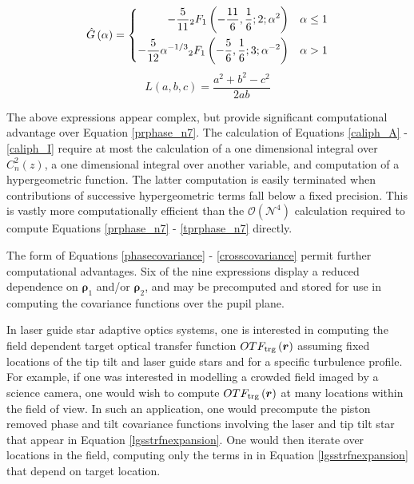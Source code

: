 \begin{equation}\label{G_hat_eqn}
\hat{G}\left(\alpha\right) = 
\left\{
\begin{aligned}
-\frac{5}{11} \vphantom{F}_{2}F_{1}\left(-\frac{11}{6}, \frac{1}{6};2; \alpha^{2}\right)              & \quad \alpha\le 1 \\
-\frac{5}{12} \alpha^{-1/3} \vphantom{F}_{2}F_{1}\left(-\frac{5}{6}, \frac{1}{6};3; \alpha^{-2}\right)  & \quad \alpha > 1
\end{aligned}
\right.
\end{equation}
\begin{equation}
L\left(a, b, c\right) = \frac{a^{2} + b^{2} - c^{2}}{2 a b}
\end{equation}

The above expressions appear complex, but provide significant
computational advantage over Equation \ref{prphase_n7}.  The
calculation of Equations \ref{caliph_A} - \ref{caliph_I} require at
most the calculation of a one dimensional integral over
$C_{n}^{2}(z)$, a one dimensional integral over another variable, and
computation of a hypergeometric function.  The latter computation is
easily terminated when contributions of successive hypergeometric
terms fall below a fixed precision.  This is vastly more
computationally efficient than the $\mathcal{O}(\mathcal{N}^{4})$
calculation required to compute Equations \ref{prphase_n7} -
\ref{tprphase_n7} directly.

The form of Equations \ref{phasecovariance} - \ref{crosscovariance}
permit further computational advantages.  Six of the nine expressions
display a reduced dependence on $\boldsymbol{\rho}_{1}$ and/or
$\boldsymbol{\rho}_{2}$, and may be precomputed and stored for use in
computing the covariance functions over the pupil plane.

In laser guide star adaptive optics systems, one is interested in
computing the field dependent target optical transfer function
$OTF_{\rm trg}\left(\boldsymbol{r}\right)$ assuming fixed locations of
the tip tilt and laser guide stars and for a specific turbulence
profile.  For example, if one was interested in modelling a crowded
field imaged by a science camera, one would wish to compute $OTF_{\rm
  trg}\left(\boldsymbol{r}\right)$ at many locations within the field
of view.  In such an application, one would precompute the piston
removed phase and tilt covariance functions involving the laser and
tip tilt star that appear in Equation \ref{lgsstrfnexpansion}.  One
would then iterate over locations in the field, computing only the
terms in in Equation \ref{lgsstrfnexpansion} that depend on target
location.


